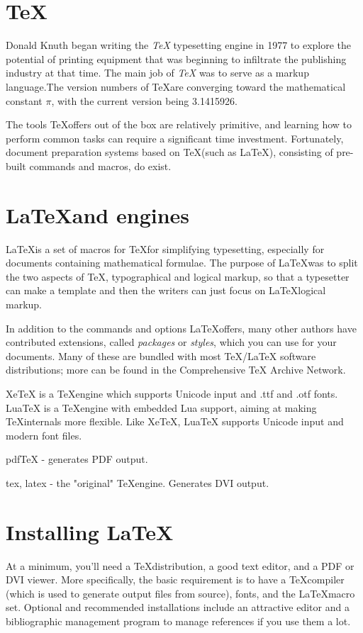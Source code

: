 \documentclass{article}
\begin{document}
\section{\TeX}

Donald Knuth began writing the \textit{TeX} typesetting engine in 1977 to explore the potential of printing equipment that was beginning to infiltrate the publishing industry at that time.  The main job of \textit{TeX} was to serve as a markup language.The version numbers of \TeX are converging toward the mathematical constant $\pi$, with the current version being 3.1415926.


The tools \TeX offers out of the box are relatively primitive, and learning how to perform common tasks can require a significant time investment. Fortunately, document preparation systems based on \TeX (such as \LaTeX), consisting of pre-built commands and macros, do exist.

\section{\LaTeX and engines}

\LaTeX is a set of macros for \TeX for simplifying typesetting, especially for documents containing mathematical formulae. The purpose of \LaTeX was to split the two aspects of \TeX, typographical and logical markup, so that a typesetter can make a template and then the writers can just focus on \LaTeX logical markup.

In addition to the commands and options \LaTeX offers, many other authors have contributed extensions, called \textit{packages} or \textit{styles}, which you can use for your documents. Many of these are bundled with most TeX/LaTeX software distributions; more can be found in the Comprehensive TeX Archive Network.


XeTeX is a \TeX engine which supports Unicode input and .ttf and .otf fonts. LuaTeX is a \TeX engine with embedded Lua support, aiming at making \TeX internals more flexible. Like XeTeX, LuaTeX supports Unicode input and modern font files.

pdfTeX - generates PDF output.

tex, latex - the "original" \TeX engine. Generates DVI output.

\section{Installing \LaTeX}

At a minimum, you'll need a \TeX distribution, a good text editor, and a PDF or DVI viewer. More specifically, the basic requirement is to have a \TeX compiler (which is used to generate output files from source), fonts, and the \LaTeX macro set. Optional and recommended installations include an attractive editor and a bibliographic management program to manage references if you use them a lot.


 
\end{document}
